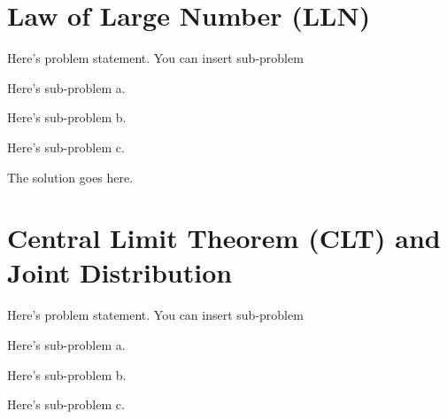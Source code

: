\documentclass[a4paper, 10pt]{article}
\begin{document}
\subject[2110205 - Statistics for Computer Engineering]


\section{Law of Large Number (LLN)}



\begin{problem}
Here's problem statement.
You can insert sub-problem
\begin{subproblems}
    \item Here's sub-problem a.
    \item Here's sub-problem b.
    \item Here's sub-problem c.
\end{subproblems}
\end{problem}

\begin{solution}
The solution goes here.
\end{solution}



\section{Central Limit Theorem (CLT) and Joint Distribution}



\begin{problem}
Here's problem statement.
You can insert sub-problem
\begin{subproblems}
    \item Here's sub-problem a.
    \item Here's sub-problem b.
    \item Here's sub-problem c.
\end{subproblems}
\end{problem}
\end{document}
